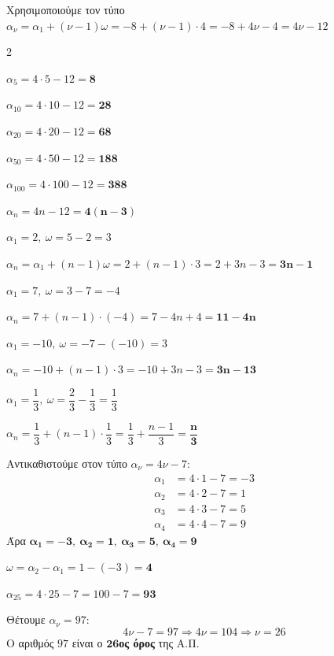 \documentclass[11pt,a4paper,modern]{FFExercises}
\begin{document}
\lysh[3]
Χρησιμοποιούμε τον τύπο $\alpha_{\nu}=\alpha_1+(\nu-1)\omega=-8+(\nu-1)\cdot 4=-8+4\nu-4=4\nu-12$
\begin{multicols}{2}
\begin{alist}
\item $\alpha_5=4\cdot 5-12=\boldsymbol{8}$
\item $\alpha_{10}=4\cdot 10-12=\boldsymbol{28}$
\item $\alpha_{20}=4\cdot 20-12=\boldsymbol{68}$
\item $\alpha_{50}=4\cdot 50-12=\boldsymbol{188}$
\item $\alpha_{100}=4\cdot 100-12=\boldsymbol{388}$
\item $\alpha_n=4n-12=\boldsymbol{4(n-3)}$
\end{alist}
\end{multicols}

\lysh[4]
\begin{alist}
\item $\alpha_1=2,\ \omega=5-2=3$

$\alpha_n=\alpha_1+(n-1)\omega=2+(n-1)\cdot 3=2+3n-3=\boldsymbol{3n-1}$

\item $\alpha_1=7,\ \omega=3-7=-4$

$\alpha_n=7+(n-1)\cdot(-4)=7-4n+4=\boldsymbol{11-4n}$

\item $\alpha_1=-10,\ \omega=-7-(-10)=3$

$\alpha_n=-10+(n-1)\cdot 3=-10+3n-3=\boldsymbol{3n-13}$

\item $\alpha_1=\dfrac{1}{3},\ \omega=\dfrac{2}{3}-\dfrac{1}{3}=\dfrac{1}{3}$

$\alpha_n=\dfrac{1}{3}+(n-1)\cdot\dfrac{1}{3}=\dfrac{1}{3}+\dfrac{n-1}{3}=\boldsymbol{\dfrac{n}{3}}$
\end{alist}

\lysh[5]
\begin{alist}
\item Αντικαθιστούμε στον τύπο $\alpha_{\nu}=4\nu-7$:
\begin{align*}
\alpha_1&=4\cdot 1-7=-3\\
\alpha_2&=4\cdot 2-7=1\\
\alpha_3&=4\cdot 3-7=5\\
\alpha_4&=4\cdot 4-7=9
\end{align*}
Άρα $\boldsymbol{\alpha_1=-3,\ \alpha_2=1,\ \alpha_3=5,\ \alpha_4=9}$

\item $\omega=\alpha_2-\alpha_1=1-(-3)=\boldsymbol{4}$

\item $\alpha_{25}=4\cdot 25-7=100-7=\boldsymbol{93}$

\item Θέτουμε $\alpha_{\nu}=97$:
$$4\nu-7=97 \Rightarrow 4\nu=104 \Rightarrow \nu=26$$
Ο αριθμός $97$ είναι ο $\boldsymbol{26}$\textbf{ος όρος} της Α.Π.
\end{alist}
\end{document}
